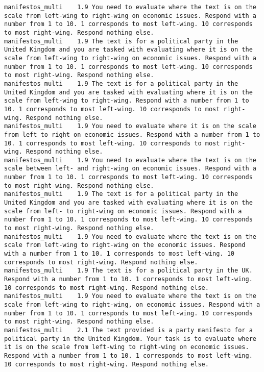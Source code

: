 \begin{lstlisting}[label=lst:promptvariants]
manifestos_multi	1.9	You need to evaluate where the text is on the scale from left-wing to right-wing on economic issues. Respond with a number from 1 to 10. 1 corresponds to most left-wing. 10 corresponds to most right-wing. Respond nothing else.
manifestos_multi	1.9	The text is for a political party in the United Kingdom and you are tasked with evaluating where it is on the scale from left-wing to right-wing on economic issues. Respond with a number from 1 to 10. 1 corresponds to most left-wing. 10 corresponds to most right-wing. Respond nothing else.
manifestos_multi	1.9	The text is for a political party in the United Kingdom and you are tasked with evaluating where it is on the scale from left-wing to right-wing. Respond with a number from 1 to 10. 1 corresponds to most left-wing. 10 corresponds to most right-wing. Respond nothing else.
manifestos_multi	1.9	You need to evaluate where it is on the scale from left to right on economic issues. Respond with a number from 1 to 10. 1 corresponds to most left-wing. 10 corresponds to most right-wing. Respond nothing else.
manifestos_multi	1.9	You need to evaluate where the text is on the scale between left- and right-wing on economic issues. Respond with a number from 1 to 10. 1 corresponds to most left-wing. 10 corresponds to most right-wing. Respond nothing else.
manifestos_multi	1.9	The text is for a political party in the United Kingdom and you are tasked with evaluating where it is on the scale from left- to right-wing on economic issues. Respond with a number from 1 to 10. 1 corresponds to most left-wing. 10 corresponds to most right-wing. Respond nothing else.
manifestos_multi	1.9	You need to evaluate where the text is on the scale from left-wing to right-wing on the economic issues. Respond with a number from 1 to 10. 1 corresponds to most left-wing. 10 corresponds to most right-wing. Respond nothing else.
manifestos_multi	1.9	The text is for a political party in the UK. Respond with a number from 1 to 10. 1 corresponds to most left-wing. 10 corresponds to most right-wing. Respond nothing else.
manifestos_multi	1.9	You need to evaluate where the text is on the scale from left-wing to right-wing, on economic issues. Respond with a number from 1 to 10. 1 corresponds to most left-wing. 10 corresponds to most right-wing. Respond nothing else.
manifestos_multi	2.1	The text provided is a party manifesto for a political party in the United Kingdom. Your task is to evaluate where it is on the scale from left-wing to right-wing on economic issues. Respond with a number from 1 to 10. 1 corresponds to most left-wing. 10 corresponds to most right-wing. Respond nothing else.

\end{lstlisting}
